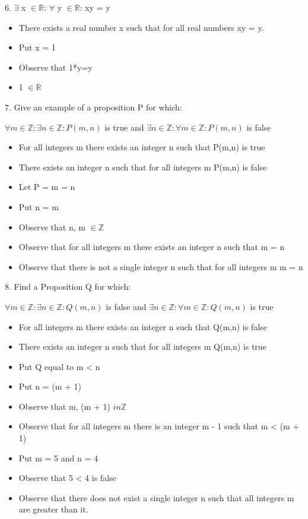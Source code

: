 \documentclass{article}
\begin{document}
  6. \(\exists\) x \(\in \mathbb{R}\): \(\forall\) y \(\in \mathbb{R}\): xy = y
  \begin{itemize}
    \item There exists a real number x such that for all real numbers xy = y.
    \item Put x = 1
    \item Observe that 1*y=y
    \item 1 $\in \mathbb{R}$
  \end{itemize}
  7. Give an example of a proposition P for which:
  \begin{center}
  $\forall m \in \mathbb{Z}: \exists n \in \mathbb{Z}: P(m,n)$ is true
  and
  $\exists n \in \mathbb{Z}: \forall m \in \mathbb{Z}: P(m,n)$ is false
  \end{center}
  \begin{itemize}
    \item For all integers m there exists an integer n such that P(m,n) is true
    \item There exists an integer n such that for all integers m P(m,n) is false
    \item Let P = m = n
    \item Put n = m
    \item Observe that n, m $\in \mathbb{Z}$
    \item Observe that for all integers m there exists an integer n such that m = n
    \item Observe that there is not a single integer n such that for all integers m m = n
  \end{itemize}
  8. Find a Proposition Q for which:
  \begin{center}
  $\forall m \in \mathbb{Z}: \exists n \in \mathbb{Z}: Q(m,n)$ is false
  and
  $\exists n \in \mathbb{Z}: \forall m \in \mathbb{Z}: Q(m,n)$ is true
  \end{center}
  \begin{itemize}
    \item For all integers m there exists an integer n such that Q(m,n) is false
    \item There exists an integer n such that for all integers m Q(m,n) is true
    \item Put Q equal to m < n
    \item Put n = (m + 1)
    \item Observe that m, (m + 1) \(in \mathbb{Z}\)
    \item Observe that for all integers m there is an integer m - 1 such that m < (m + 1)
    \item Put m = 5 and n = 4
    \item Observe that 5 < 4 is false
    \item Observe that there does not exist a single integer n such that all integers m are greater than it.
  \end{itemize}
\end{document}
